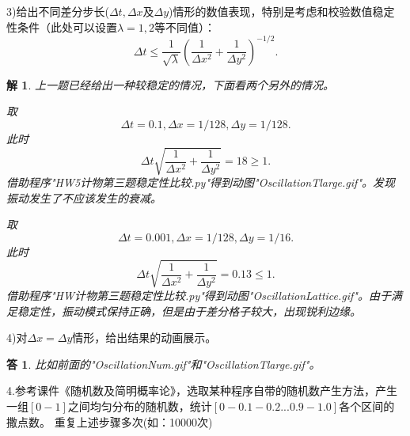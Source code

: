 \documentclass[10pt]{ctexart}
\newtheorem*{answer}{答}
\newtheorem*{solution}{解}
\begin{document}
3)给出不同差分步长($\Delta t,\Delta x$及$\Delta y$)情形的数值表现，特别是考虑和校验数值稳定性条件（此处可以设置$\lambda=1,2$等不同值）：
$$\Delta t\leq \frac{1}{\sqrt{\lambda}}\left(\frac{1}{\Delta x^2}+\frac{1}{\Delta y^2}\right)^{-1/2}.$$
\begin{solution}
    上一题已经给出一种较稳定的情况，下面看两个另外的情况。

    取
    $$\Delta t=0.1,\Delta x=1/128,\Delta y=1/128.$$
    此时
    $$\Delta t\sqrt{\frac{1}{\Delta x^2}+\frac{1}{\Delta y^2}}=18\geq 1.$$
    借助程序"HW5计物第三题稳定性比较.py"得到动图"OscillationTlarge.gif"。发现振动发生了不应该发生的衰减。

    取
    $$\Delta t=0.001,\Delta x=1/128,\Delta y=1/16.$$
    此时
    $$\Delta t\sqrt{\frac{1}{\Delta x^2}+\frac{1}{\Delta y^2}}=0.13\leq 1.$$
    借助程序"HW计物第三题稳定性比较.py"得到动图"OscillationLattice.gif"。由于满足稳定性，振动模式保持正确，但是由于差分格子较大，出现锐利边缘。
\end{solution}
4)对$\Delta x=\Delta y$情形，给出结果的动画展示。
\begin{answer}
    比如前面的"OscillationNum.gif"和"OscillationTlarge.gif"。
\end{answer}
4.参考课件《随机数及简明概率论》，选取某种程序自带的随机数产生方法，产生一组$[0-1]$之间均匀分布的随机数，统计$[0-0.1-0.2...0.9-1.0]$各个区间的撒点数。
重复上述步骤多次(如：10000次)
\end{document}
